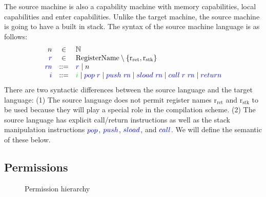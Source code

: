 \documentclass[a4paper]{article}
\newcommand{\sourcecolor}[1]{\color{blue}}
\newcommand{\src}[1]{{\sourcecolor{} #1}}
\newcommand{\targetcolor}[1]{\color{green}}
\newcommand{\trg}[1]{{\targetcolor{} #1}}
\newcommand{\zinstr}[1]{#1}
\newcommand{\oneinstr}[2]{
  \ifthenelse{\equal{#2}{}}
  {\zinstr{#1}}
  {\zinstr{#1} \; #2}
}
\newcommand{\twoinstr}[3]{
  \ifthenelse{\equal{#2#3}{}}
  {\zinstr{#1}}
  {\zinstr{#1} \; #2 \; #3}
}
\newcommand{\sreturn}{\zinstr{\src{return}}}
\newcommand{\spush}[1]{\oneinstr{\src{push}}{#1}}
\newcommand{\spop}[1]{\oneinstr{\src{pop}}{#1}}
\newcommand{\ssload}[1]{\oneinstr{\src{sload}}{#1}}
\newcommand{\scall}[2]{\twoinstr{\src{call}}{#1}{#2}}
\newcommand{\plaindom}[1]{\mathrm{#1}}
\newcommand{\RegName}{\plaindom{RegisterName}}
\newcommand{\nats}{\mathbb{N}}
\newcommand{\var}[1]{\mathit{#1}}
\newcommand{\rn}{\var{rn}}
\newcommand{\rstk}{\mathrm{r}_\mathrm{stk}}
\newcommand{\rO}{\mathrm{r}_\mathrm{ret}}
\newcommand{\plainperm}[1]{\mathrm{#1}}
\newcommand{\rwlxo}{\plainperm{rwlxo}}
\newcommand{\rwlo}{\plainperm{rwlo}}
\newcommand{\rwl}{\plainperm{rwl}}
\newcommand{\rwxo}{\plainperm{rwxo}}
\newcommand{\rwo}{\plainperm{rwo}}
\newcommand{\rw}{\plainperm{rw}}
\newcommand{\rxo}{\plainperm{rxo}}
\newcommand{\ro}{\plainperm{ro}}
\newcommand{\readonly}{\plainperm{r}}
\newcommand{\noperm}{\plainperm{0}}
\newcommand{\nopermo}{\plainperm{0o}}
\newcommand{\enter}{\plainperm{e}}
\begin{document}
The source machine is also a capability machine with memory capabilities, local capabilities and enter capabilities. Unlike the target machine, the source machine is going to have a built in stack. The syntax of the source machine language is as follows:
\[
  \begin{array}{rcl}
    n & \in & \nats \\
    \src{r} &\in &  \RegName \setminus \{\rO,\rstk\}\\
    \src{\rn} &::= & \src{r} \mid n \\
    \src{i} & ::= &  \trg{i} \mid \spop{\src{r}} \mid \spush{\src{\rn}} \mid \ssload{\src{\rn}} \mid \scall{\src{r}}{\src{\rn}} \mid \sreturn
  \end{array}
\]
There are two syntactic differences between the source language and the target language: (1) The source language does not permit register names $\rO$ and $\rstk$ to be used because they will play a special role in the compilation scheme. (2) The source language has explicit call/return instructions as well as the stack manipulation instructions $\spop{}$, $\spush{}$, $\ssload{}$, and $\scall{}{}$. We will define the semantic of these below.

\subsection{Permissions}


\begin{figure}[!h]
  \centering

  \caption{Permission hierarchy}
  \label{fig:perm-hier}
\end{figure}
\end{document}
